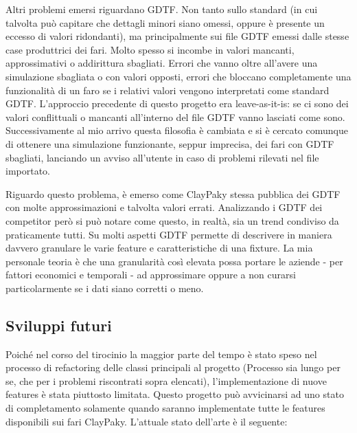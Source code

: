 \documentclass[main.tex]{subfiles}
\begin{document}
Altri problemi emersi riguardano GDTF. Non tanto sullo standard (in cui talvolta può capitare che dettagli minori siano omessi, oppure è presente un eccesso di valori ridondanti), ma principalmente sui file GDTF emessi dalle stesse case produttrici dei fari. Molto spesso si incombe in valori mancanti, approssimativi o addirittura sbagliati. Errori che vanno oltre all'avere una simulazione sbagliata o con valori opposti, errori che bloccano completamente una funzionalità di un faro se i relativi valori vengono interpretati come standard GDTF. L'approccio precedente di questo progetto era leave-as-it-is: se ci sono dei valori conflittuali o mancanti all'interno del file GDTF vanno lasciati come sono. Successivamente al mio arrivo questa filosofia è cambiata e si è cercato comunque di ottenere una simulazione funzionante, seppur imprecisa, dei fari con GDTF sbagliati, lanciando un avviso all'utente in caso di problemi rilevati nel file importato.

Riguardo questo problema, è emerso come ClayPaky stessa pubblica dei GDTF con molte approssimazioni e talvolta valori errati. Analizzando i GDTF dei competitor però si può notare come questo, in realtà, sia un trend condiviso da praticamente tutti. Su molti aspetti GDTF permette di descrivere in maniera davvero granulare le varie feature e caratteristiche di una fixture. La mia personale teoria è che una granularità così elevata possa portare le aziende - per fattori economici e temporali - ad approssimare oppure a non curarsi particolarmente se i dati siano corretti o meno. 

\subsection{Sviluppi futuri}\label{subsec:6_newDevelops}
Poiché nel corso del tirocinio la maggior parte del tempo è stato speso nel processo di refactoring delle classi principali al progetto (Processo sia lungo per se, che per i problemi riscontrati sopra elencati), l'implementazione di nuove features è stata piuttosto limitata. Questo progetto può avvicinarsi ad uno stato di completamento solamente quando saranno implementate tutte le features disponibili sui fari ClayPaky. L'attuale stato dell'arte è il seguente: \newline
\end{document}

